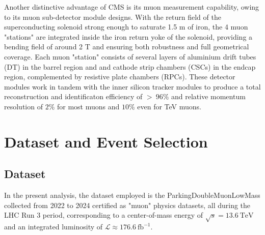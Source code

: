 \documentclass[10pt,twocolumn]{article}
\begin{document}
Another distinctive advantage of CMS is its muon measurement capability, owing to its muon sub-detector module designs. With the return field of the superconducting solenoid strong enough to saturate 1.5 m of iron, the 4 muon "stations" are integrated inside the iron return yoke of the solenoid, providing a bending field of around 2 T and ensuring both robustness and full geometrical coverage. Each muon "station" consists of several layers of aluminium drift tubes (DT) in the barrel region and and cathode strip chambers (CSCs) in the endcap region, complemented by resistive plate chambers (RPCs). These detector modules work in tandem with the inner silicon tracker modules to produce a total reconstruction and identificaton efficiency of $> ~ 96\%$ and relative momentum resolution of $2\%$ for most muons and $10\%$ even for TeV muons.

\section{Dataset and Event Selection}

\subsection{Dataset}

In the present analysis, the dataset employed is the ParkingDoubleMuonLowMass collected from 2022 to 2024 certified as "muon" physics datasets, all during the LHC Run 3 period, corresponding to a center-of-mass energy of $\sqrt{s} = 13.6 ~\text{TeV}$ and an integrated luminosity of $\mathcal{L}\approx176.6~\text{fb}^{-1}$\cite{CMS:LUM-22-001}\cite{CMS:DP-LUMI-2023}\cite{CMS:LUMI-PUB}.

\end{document}
